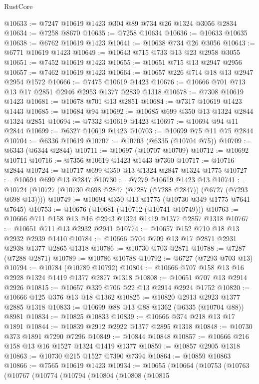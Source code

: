 \begin{lexlean}{RustCore}
\begin{coremodule}
@10633 := @7247 @10619 @1423 @304 @89 @734 @26 @1324 @3056 @2834
@10634 := @7258 @8670
@10635 := @7258 @10634
@10636 := @10633 @10635
@10638 := @6762 @10619 @1423
@10641 := @10638 @734 @26 @3056
@10643 := @6771 @10619 @1423
@10649 := @10643 @715 @733 @13 @23 @2958 @3055
@10651 := @7452 @10619 @1423
@10655 := @10651 @715 @13 @2947 @2956
@10657 := @7462 @10619 @1423
@10664 := @10657 @226 @714 @18 @13 @2947 @2954 @1572
@10666 := @7475 @10619 @1423
@10676 := @10666 @701 @713 @13 @17 @2851 @2946 @2953 @1377 @2839 @1318
@10678 := @7308 @10619 @1423
@10681 := @10678 @701 @13 @2851
@10684 := @7317 @10619 @1423 @1443
@10685 := @10684 @94
@10692 := @10685 @699 @350 @13 @1324 @2844 @1324 @2851
@10694 := @7332 @10619 @1423
@10697 := @10694 @94 @11 @2844
@10699 := @6327 @10619 @1423
@10703 := @10699 @75 @11 @75 @2844
@10704 := @6336 @10619
@10707 := @10703 (@6335 (@10704 @75))
@10709 := @6343 (@6344 @2844)
@10711 := @10697 (@10707 @10709)
@10712 := @10692 @10711
@10716 := @7356 @10619 @1423 @1443 @7360
@10717 := @10716 @2844
@10724 := @10717 @699 @350 @13 @1324 @2847 @1324 @1775
@10727 := @10694 @699 @13 @2847
@10730 := @7279 @10619 @1423 @13
@10741 := @10724 (@10727 (@10730 @698 @2847 (@7287 (@7288 @2847)) (@6727 (@7293 @698 @13))))
@10749 := @10694 @350 @13 @1775 (@10730 @349 @1775 @7641 @7645)
@10753 := @10676 (@10681 (@10712 (@10741 @10749)))
@10763 := @10666 @711 @158 @13 @16 @2943 @1324 @1419 @1377 @2857 @1318
@10767 := @10651 @711 @13 @2932 @2941
@10774 := @10657 @152 @710 @18 @13 @2932 @2939 @1410
@10784 := @10666 @704 @709 @13 @17 @2871 @2931 @2938 @1377 @2865 @1318
@10786 := @10730 @703 @2871
@10788 := @7287 (@7288 @2871)
@10789 := @10786 @10788
@10792 := @6727 (@7293 @703 @13)
@10794 := @10784 (@10789 @10792)
@10804 := @10666 @707 @158 @13 @16 @2928 @1324 @1419 @1377 @2877 @1318
@10808 := @10651 @707 @13 @2914 @2926
@10815 := @10657 @339 @706 @22 @13 @2914 @2924 @1752
@10820 := @10666 @125 @376 @13 @18 @1362
@10825 := @10820 @2913 @2923 @1377 @2885 @1318
@10833 := @10699 @88 @13 @88 @1362 (@6335 (@10704 @88)) @8981
@10834 := @10825 @10833
@10839 := @10666 @374 @218 @13 @17 @1891
@10844 := @10839 @2912 @2922 @1377 @2895 @1318
@10848 := @10730 @373 @1891 @7290 @7296
@10849 := @10844 @10848
@10857 := @10666 @216 @158 @13 @16 @1527 @1324 @1419 @1377
@10859 := @10857 @2905 @1318
@10863 := @10730 @215 @1527 @7390 @7394
@10864 := @10859 @10863
@10866 := @7565 @10619 @1423
@10934 := @10655
    (@10664
      (@10753
        (@10763
          (@10767
            (@10774
              (@10794
                (@10804
                  (@10808
                    (@10815

\end{coremodule}
\end{lexlean}
